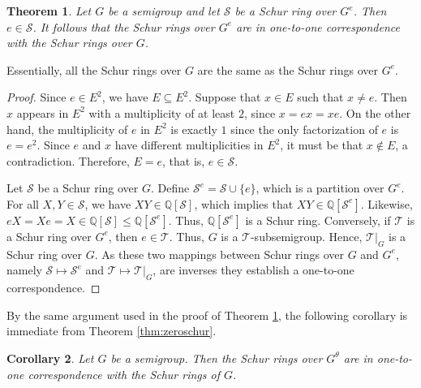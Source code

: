 \documentclass{article}
\theoremstyle{plain}
\newtheorem{Thm}{Theorem}[section]
\newtheorem{Cor}[Thm]{Corollary}
\theoremstyle{definition}
\renewcommand{\S}{\mathcal{S}}
\newcommand{\T}{\mathcal{T}}
\newcommand{\Q}{\mathbb{Q}}
\newcommand{\QS}{\Q[\S]}
\begin{document}
\begin{Thm}\label{thm:monoidSchur} Let $G$ be a semigroup and let $\S$ be a Schur ring over $G^e$. Then $e\in \S$. It follows that the Schur rings over $G^e$ are in one-to-one correspondence with the Schur rings over $G$. 
\end{Thm}

Essentially, all the Schur rings over $G$ are the same as the Schur rings over $G^e$.

\begin{proof}
    Since $e\in E^2$, we have $E\subseteq E^2$. Suppose that $x\in E$ such that $x\neq e$. Then $x$ appears in $E^2$ with a multiplicity of at least $2$, since $x = ex=xe$. On the other hand, the multiplicity of $e$ in $E^2$ is exactly $1$ since the only factorization of $e$ is $e=e^2$. Since $e$ and $x$ have different multiplicities in $E^2$, it must be that $x\notin E$, a contradiction. Therefore, $E=e$, that is, $e\in \S$.

    Let $\S$ be a Schur ring over $G$. Define $\S^e = \S\cup \{e\}$, which is a partition over $G^e$. For all $X,Y\in \S$, we have $XY\in \QS$, which implies that $XY\in \Q[\S^e]$. Likewise, $eX=Xe=X\in \QS \le \Q[\S^e]$. Thus, $\Q[\S^e]$ is a Schur ring. Conversely, if $\T$ is a Schur ring over $G^e$, then $e\in \T$. Thus, $G$ is a $\T$-subsemigroup. Hence, $\T|_G$ is a Schur ring over $G$. As these two mappings between Schur rings over $G$ and $G^e$, namely $\S\mapsto \S^e$ and $\T\mapsto \T|_G$, are inverses they establish a one-to-one correspondence. 
\end{proof}



By the same argument used in the proof of Theorem \ref{thm:monoidSchur}, the following corollary is immediate from Theorem \ref{thm:zeroschur}. 

\begin{Cor}\label{cor:thetaschur} Let $G$ be a semigroup. Then the Schur rings over $G^\theta$ are in one-to-one correspondence with the Schur rings of $G$.
\end{Cor}
\end{document}
